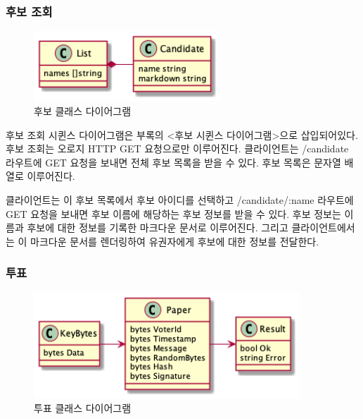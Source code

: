 \documentclass[10pt,a4paper,left=15mm,right=15mm,top=20mm,bottom=20mm]{article}
\begin{document}
    \subsubsection{후보 조회}

    \begin{figure}[h]
        \begin{center}
            \includegraphics[width=7cm]{candidate-class}
            \caption{후보 클래스 다이어그램}
        \end{center}
    \end{figure}

    후보 조회 시퀸스 다이어그램은 부록의 <후보 시퀸스 다이어그램>으로 삽입되어있다. 후보 조회는 오로지 HTTP GET 요청으로만 이루어진다. 클라이언트는 /candidate 라우트에 GET 요청을 보내면 전체 후보 목록을 받을 수 있다. 후보 목록은 문자열 배열로 이루어진다.

    클라이언트는 이 후보 목록에서 후보 아이디를 선택하고 /candidate/:name 라우트에 GET 요청을 보내면 후보 이름에 해당하는 후보 정보를 받을 수 있다. 후보 정보는 이름과 후보에 대한 정보를 기록한 마크다운 문서로 이루어진다. 그리고 클라이언트에서는 이 마크다운 문서를 렌더링하여 유권자에게 후보에 대한 정보를 전달한다. 

    \subsubsection{투표}

    \begin{figure}[h]
        \begin{center}
            \includegraphics[width=10cm]{vote-class}
            \caption{투표 클래스 다이어그램}
        \end{center}
    \end{figure}
\end{document}
